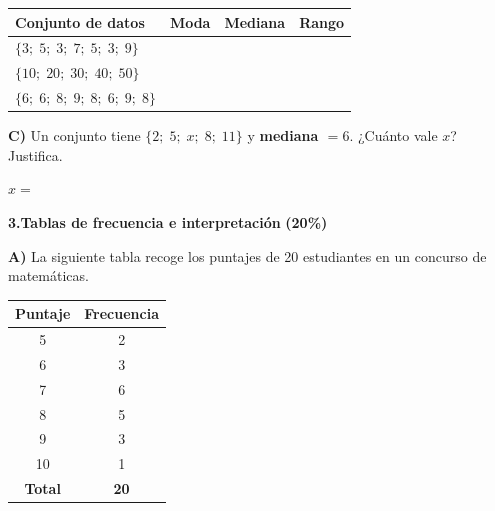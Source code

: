 \documentclass[12pt, letterpaper]{article}
\newcommand{\boxfill}[1][1.5cm]{\tcbox[on line, size=minimal,
	colframe=valdark!60, colback=boxbg, boxrule=0.8pt, arc=1mm,
	boxsep=3pt, left=2pt, right=2pt, top=2pt, bottom=2pt]%
	{\makebox[#1]{\vphantom{M}}}}
\begin{document}
	\vspace{0.2cm}
	\renewcommand{\arraystretch}{1.8}
	\begin{center}
		\begin{tabular}{|m{6.5cm}|m{2.2cm}|m{2.2cm}|m{2.2cm}|}
			\hline
			\rowcolor{valblue!20}
			\textbf{Conjunto de datos} & \textbf{Moda} &
			\textbf{Mediana} & \textbf{Rango} \\
			\hline
			$\{3;\;5;\;3;\;7;\;5;\;3;\;9\}$ &
			\boxfill[1.8cm] & \boxfill[1.8cm] & \boxfill[1.8cm] \\
			\hline
			$\{10;\;20;\;30;\;40;\;50\}$ &
			\boxfill[1.8cm] & \boxfill[1.8cm] & \boxfill[1.8cm] \\
			\hline
			$\{6;\;6;\;8;\;9;\;8;\;6;\;9;\;8\}$ &
			\boxfill[1.8cm] & \boxfill[1.8cm] & \boxfill[1.8cm] \\
			\hline
		\end{tabular}
	\end{center}
	
	\vspace{0.4cm}
	\textbf{C)} Un conjunto tiene $\{2;\;5;\;x;\;8;\;11\}$ y
	\textbf{mediana $= 6$}.
	¿Cuánto vale $x$? Justifica.
	
	\begin{tcolorbox}[colback=white, colframe=valdark!40, boxrule=0.5pt, arc=1mm]
		\vspace{0.7cm}
		$x =$ \boxfill[2.5cm]
	\end{tcolorbox}
	
	\vspace{0.3cm}
	\noindent\textbf{3.\;Tablas de frecuencia e interpretación}
	\hfill\textbf{(20\%)}
	
	\vspace{0.3cm}
	\textbf{A)} La siguiente tabla recoge los puntajes de 20 estudiantes
	en un concurso de matemáticas.
	
	\vspace{0.2cm}
	\begin{center}
		\renewcommand{\arraystretch}{1.6}
		\begin{tabular}{|c|c|}
			\hline
			\rowcolor{valblue!25}
			\textbf{Puntaje} & \textbf{Frecuencia} \\
			\hline
			5  & 2 \\
			\hline
			6  & 3 \\
			\hline
			7  & 6 \\
			\hline
			8  & 5 \\
			\hline
			9  & 3 \\
			\hline
			10 & 1 \\
			\hline
			\rowcolor{boxbg}
			\textbf{Total} & \textbf{20} \\
			\hline
		\end{tabular}
	\end{center}
	
\end{document}
